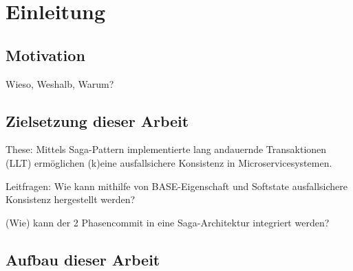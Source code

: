\chapter{Einleitung}

\section{Motivation}

Wieso, Weshalb, Warum?

\section{Zielsetzung dieser Arbeit}

These: Mittels Saga-Pattern implementierte lang andauernde Transaktionen (LLT) ermöglichen (k)eine ausfallsichere Konsistenz in Microservicesystemen. 

Leitfragen: 
Wie kann mithilfe von BASE-Eigenschaft und Softstate ausfallsichere Konsistenz hergestellt werden?

(Wie) kann der 2 Phasencommit in eine Saga-Architektur integriert werden?

\section{Aufbau dieser Arbeit}

